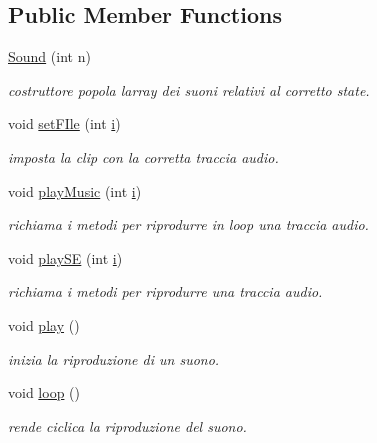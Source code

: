 \subsection*{Public Member Functions}
\begin{DoxyCompactItemize}
\item 
\hyperlink{classprogetto_1_1_sound_aed1261999531d2ad6a7ee45254d5d192}{Sound} (int n)
\begin{DoxyCompactList}\small\item\em costruttore popola l\textquotesingle{}array dei suoni relativi al corretto state. \end{DoxyCompactList}\item 
void \hyperlink{classprogetto_1_1_sound_a7dfb2cac645e127badf36478fd7aaa40}{set\+F\+Ile} (int \hyperlink{classprogetto_1_1_sound_acb559820d9ca11295b4500f179ef6392}{i})
\begin{DoxyCompactList}\small\item\em imposta la clip con la corretta traccia audio. \end{DoxyCompactList}\item 
void \hyperlink{classprogetto_1_1_sound_afbebd3583bea93ca3867632861ec5801}{play\+Music} (int \hyperlink{classprogetto_1_1_sound_acb559820d9ca11295b4500f179ef6392}{i})
\begin{DoxyCompactList}\small\item\em richiama i metodi per riprodurre in loop una traccia audio. \end{DoxyCompactList}\item 
void \hyperlink{classprogetto_1_1_sound_a98228f023eb842c07bae8aa04a26db94}{play\+SE} (int \hyperlink{classprogetto_1_1_sound_acb559820d9ca11295b4500f179ef6392}{i})
\begin{DoxyCompactList}\small\item\em richiama i metodi per riprodurre una traccia audio. \end{DoxyCompactList}\item 
void \hyperlink{classprogetto_1_1_sound_a6d58098c6cf63c241ed03bc797256bb1}{play} ()
\begin{DoxyCompactList}\small\item\em inizia la riproduzione di un suono. \end{DoxyCompactList}\item 
void \hyperlink{classprogetto_1_1_sound_afe461d27b9c48d5921c00d521181f12f}{loop} ()
\begin{DoxyCompactList}\small\item\em rende ciclica la riproduzione del suono. \end{DoxyCompactList}\item 

\end{DoxyCompactItemize}
